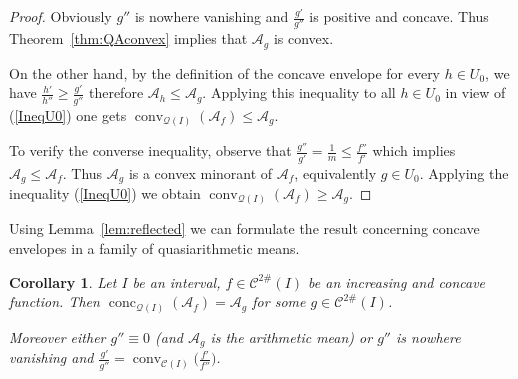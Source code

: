 \documentclass[12pt,oneside]{amsart}
\newtheorem{cor}[thm]{Corollary}
\theoremstyle{definition}
\numberwithin{equation}{section}
\def\eq#1{{\rm(\ref{#1})}}
\def\A{\mathscr{A}}
\def\Cts{\mathcal{C}^{2\#}}
\def\calQ{\mathcal{Q}}
\newcommand{\QA}[1]{\A_{#1}}
\DeclareMathOperator{\conv}{conv}
\DeclareMathOperator{\conc}{conc}
\begin{document}
\begin{proof}
Obviously $g''$ is nowhere vanishing and $\frac{g'}{g''}$ is positive and concave. Thus Theorem~\ref{thm:QAconvex} implies that $\QA{g}$ is convex.

On the other hand, by the definition of the concave envelope for every $h \in U_0$, we have $\frac{h'}{h''} \ge \frac{g'}{g''}$ therefore
$\QA{h}\le \QA{g}$. Applying this inequality to all $h \in U_0$ in view of \eq{IneqU0} one gets $\conv_{\calQ(I)}(\QA{f})\le \QA{g}$. 

To verify the converse inequality, observe that $\frac{g''}{g'}=\frac1m\le \frac{f''}{f'}$ which implies $\QA{g}\le \QA{f}$. Thus $\QA{g}$ is a convex minorant of $\QA{f}$, equivalently $g \in U_0$. Applying the inequality \eq{IneqU0} we obtain $\conv_{\calQ(I)}(\QA{f})\ge \QA{g}$. 
\end{proof}


Using Lemma~\ref{lem:reflected} we can formulate the result concerning concave envelopes in a family of quasiarithmetic means. 

\begin{cor}
Let $I$ be an interval, $f \in \Cts(I)$ be an increasing and concave function. Then $\conc_{\calQ(I)}(\QA{f})=\QA{g}$ for some $g \in \Cts(I)$. 

Moreover either $g''\equiv 0$ (and $\QA{g}$ is the arithmetic mean) or $g''$ is nowhere vanishing and $\frac{g'}{g''}=\conv_{\mathcal{C}(I)}\big(\frac{f'}{f''}\big)$.
\end{cor}


%
%
\end{document}
